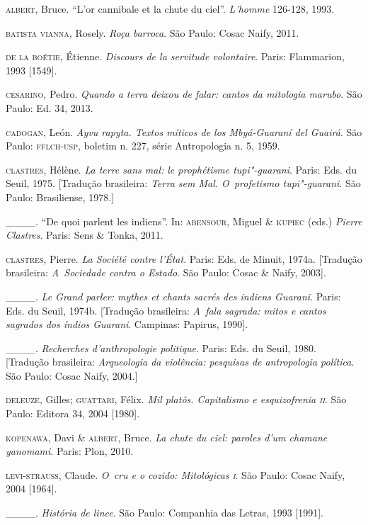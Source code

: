 \begin{Parskip}
\textsc{albert}, Bruce. ``L’or cannibale et la chute du ciel''. \emph{L’homme} 126-128,
1993.

\textsc{batista} \textsc{vianna}, Rosely. \emph{Roça barroca}. São Paulo: Cosac Naify, 2011.

\textsc{de la boétie}, Étienne. \emph{Discours de la servitude volontaire}. Paris:
Flammarion, 1993 [1549].

\textsc{cesarino}, Pedro. \emph{Quando a terra deixou de falar: cantos da mitologia
marubo}. São Paulo: Ed. 34, 2013.

\textsc{cadogan}, León. \emph{Ayvu rapyta. Textos míticos de los Mbyá-Guaraní del
Guairá}. São Paulo: \textsc{fflch}-\textsc{usp}, boletim n. 227, série Antropologia n. 5,
1959.

\textsc{clastres}, Hélène. \emph{La terre sans mal: le prophétisme tupi"-guarani}. Paris:
Eds. du Seuil, 1975. [Tradução brasileira: \emph{Terra sem Mal. O~profetismo
tupi"-guarani}. São Paulo: Brasiliense, 1978.]

\_\_\_\_. ``De quoi parlent les indiens''. In: \textsc{abensour}, Miguel \& \textsc{kupiec}
(eds.) \emph{Pierre Clastres}. Paris: Sens \& Tonka, 2011.

\textsc{clastres}, Pierre. \emph{La Société contre l’État}. Paris: Eds. de Minuit,
1974a. [Tradução brasileira: \emph{A~Sociedade contra o Estado}. São Paulo:
Cosac \& Naify, 2003].

\_\_\_\_. \emph{Le Grand parler: mythes et chants sacrés des indiens Guarani}.
Paris: Eds. du Seuil, 1974b. [Tradução brasileira: \emph{A~fala sagrada:
mitos e cantos sagrados dos índios Guarani}. Campinas: Papirus, 1990]. 

\_\_\_\_. \emph{Recherches d’anthropologie politique}. Paris: Eds. du Seuil, 1980.
[Tradução brasileira: \emph{Arqueologia da violência: pesquisas de
antropologia política}. São Paulo: Cosac Naify, 2004.] 

\textsc{deleuze}, Gilles; \textsc{guattari}, Félix. \emph{Mil platôs. Capitalismo e
esquizofrenia \textsc{ii}}. São Paulo: Editora 34, 2004 [1980].

\textsc{kopenawa}, Davi \& \textsc{albert}, Bruce. \emph{La chute du ciel: paroles d’um chamane
yanomami}. Paris: Plon, 2010.

\textsc{levi}-\textsc{strauss}, Claude. \emph{O~cru e o cozido: Mitológicas \textsc{i}}. São Paulo: Cosac
Naify, 2004 [1964].

\_\_\_\_. \emph{História de lince}. São Paulo: Companhia das Letras, 1993 [1991]. 


\end{Parskip}
